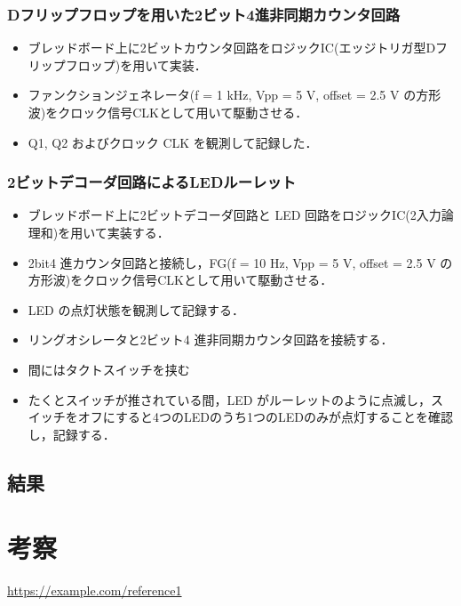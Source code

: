 \documentclass{ltjsarticle}
\begin{document}
\subsubsection{Dフリップフロップを用いた2ビット4進非同期カウンタ回路}
\begin{itemize}
  \item ブレッドボード上に2ビットカウンタ回路をロジックIC(エッジトリガ型Dフリップフロップ)を用いて実装．
  \item ファンクションジェネレータ(f = 1 kHz, Vpp = 5 V, offset = 2.5 V の方形波)をクロック信号CLKとして用いて駆動させる．
  \item Q1, Q2 およびクロック CLK を観測して記録した．
\end{itemize}

\subsubsection{2ビットデコーダ回路によるLEDルーレット}
\begin{itemize}
  \item ブレッドボード上に2ビットデコーダ回路と LED 回路をロジックIC(2入力論理和)を用いて実装する．
  \item 2bit4 進カウンタ回路と接続し，FG(f = 10 Hz, Vpp = 5 V, offset = 2.5 V の方形波)をクロック信号CLKとして用いて駆動させる．
  \item LED の点灯状態を観測して記録する．
\end{itemize}

\begin{itemize}
  \item リングオシレータと2ビット4 進非同期カウンタ回路を接続する．
  \item 間にはタクトスイッチを挟む
  \item たくとスイッチが推されている間，LED がルーレットのように点滅し，スイッチをオフにすると4つのLEDのうち1つのLEDのみが点灯することを確認し，記録する．
\end{itemize}
\subsection{結果}

\section{考察}

\begin{thebibliography}{9}
 \url{https://example.com/reference1}
\end{thebibliography}
\end{document}
